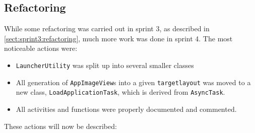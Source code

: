 \subsection{Refactoring}\label{sect:sprint4:refactoring}
While some refactoring was carried out in sprint 3, as described in \cref{sect:sprint3:refactoring}, much more work was done in sprint 4.
The most noticeable actions were:
\begin{itemize}
\item \lstinline!LauncherUtility! was split up into several smaller classes
\item All generation of \lstinline!AppImageView!s into a given \lstinline!targetlayout! was moved to a new class, \lstinline!LoadApplicationTask!, which is derived from \lstinline!AsyncTask!.
\item All activities and functions were properly documented and commented. 
\end{itemize}

These actions will now be described:

